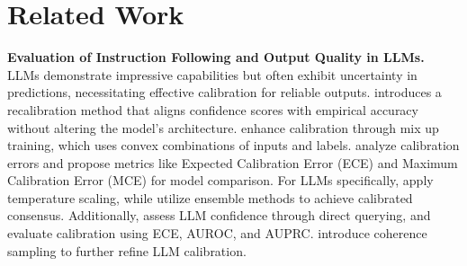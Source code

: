 \section{Related Work} \label{sec:2}

\textbf{Evaluation of Instruction Following and Output Quality in LLMs.} LLMs demonstrate impressive capabilities but often exhibit uncertainty in predictions, necessitating effective calibration for reliable outputs. \cite{kuleshov2018accurate} introduces a recalibration method that aligns confidence scores with empirical accuracy without altering the model’s architecture. \cite{zhang2017mixup} enhance calibration through mix up training, which uses convex combinations of inputs and labels. \cite{guo2017calibration} analyze calibration errors and propose metrics like Expected Calibration Error (ECE) and Maximum Calibration Error (MCE) for model comparison. For LLMs specifically, \cite{desai2020calibration} apply temperature scaling, while \cite{zhao2021calibrate} utilize ensemble methods to achieve calibrated consensus. Additionally, \cite{tian2023just} assess LLM confidence through direct querying, and \cite{he2023investigating} evaluate calibration using ECE, AUROC, and AUPRC. \cite{lyu2024calibrating} introduce coherence sampling to further refine LLM calibration.

